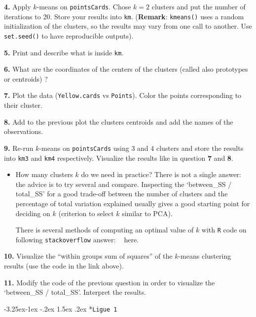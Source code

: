 \documentclass[]{book}
\makeatletter
\newenvironment{rmdblock}[1]
  {\begin{shaded*}
  \begin{itemize}
  \renewcommand{\labelitemi}{
    \raisebox{-.7\height}[0pt][0pt]{
      {\setkeys{Gin}{width=2em,keepaspectratio}\texttt{[image: img/icons/\#1]}}
    }
  }
  \item
  }
  {
  \end{itemize}
  \end{shaded*}
  }
\newenvironment{rmdcaution}
  {\begin{rmdblock}{caution}}
  {\end{rmdblock}}
\renewcommand\subsection{\@startsection{subsection}{2}{\z@}%
                                     {-3.25ex\@plus -1ex \@minus -.2ex}%
                                     {1.5ex \@plus .2ex}%
                                     {\normalfont\large\bfseries\color{Violet}}}
\theoremstyle{definition}
\theoremstyle{definition}
\theoremstyle{definition}
\theoremstyle{remark}
\makeatother
\begin{document}
\textbf{4.} Apply \(k\)-means on \texttt{pointsCards}. Chose \(k=2\)
clusters and put the number of iterations to 20. Store your results into
\texttt{km}. (\textbf{Remark}: \texttt{kmeans()} uses a random
initialization of the clusters, so the results may vary from one call to
another. Use \texttt{set.seed()} to have reproducible outputs).

\textbf{5.} Print and describe what is inside \texttt{km}.

\textbf{6.} What are the coordinates of the centers of the clusters
(called also prototypes or centroids) ?

\textbf{7.} Plot the data (\texttt{Yellow.cards} vs \texttt{Points}).
Color the points corresponding to their cluster.

\textbf{8.} Add to the previous plot the clusters centroids and add the
names of the observations.

\textbf{9.} Re-run \(k\)-means on \texttt{pointsCards} using 3 and 4
clusters and store the results into \texttt{km3} and \texttt{km4}
respectively. Visualize the results like in question \textbf{7} and
\textbf{8}.

\begin{rmdcaution}
How many clusters \(k\) do we need in practice? There is not a single
answer: the advice is to try several and compare. Inspecting the
`between\_SS / total\_SS' for a good trade-off between the number of
clusters and the percentage of total variation explained usually gives a
good starting point for deciding on \(k\) (criterion to select \(k\)
similar to PCA).

There is several methods of computing an optimal value of \(k\) with
\texttt{R} code on following \texttt{stackoverflow} answer:
\textcolor{white}{[}\faStackOverflow\textcolor{white}{]} here.
\end{rmdcaution}

\textbf{10.} Visualize the ``within groups sum of squares'' of the
\(k\)-means clustering results (use the code in the link above).

\textbf{11.} Modify the code of the previous question in order to
visualize the `between\_SS / total\_SS'. Interpret the results.

\subsection*{\texorpdfstring{\texttt{Ligue\ 1}}{Ligue 1}}\label{ligue-1}
\end{document}
